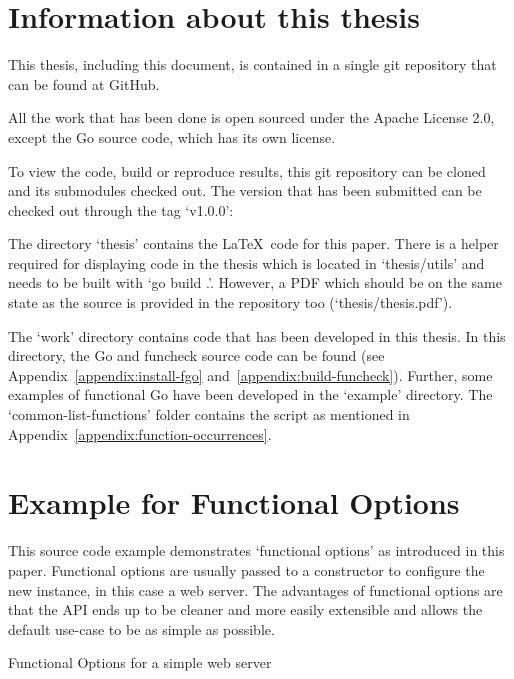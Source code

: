 \section{Information about this thesis}

This thesis, including this document, is contained in a single git repository
that can be found at GitHub\autocite{git-repo}.

All the work that has been done is open sourced under the Apache License 2.0,
except the Go source code, which has its own license.

To view the code, build or reproduce results, this git repository can be cloned
and its submodules checked out. The version that has been submitted can be checked
out through the tag `v1.0.0':

The directory `thesis' contains the \LaTeX\ code for this paper. There is a helper
required for displaying code in the thesis which is located in `thesis/utils' and
needs to be built with `go build .'. However, a PDF which should be on the same state
as the source is provided in the repository too (`thesis/thesis.pdf').

The `work' directory contains code that has been developed in this thesis. In this
directory, the Go and funcheck source code can be found (see Appendix~\ref{appendix:install-fgo}
and~\ref{appendix:build-funcheck}). Further, some examples
of functional Go have been developed in the `example' directory. The `common-list-functions'
folder contains the script as mentioned in Appendix~\ref{appendix:function-occurrences}.

\section{Example for Functional Options}\label{appendix:funcopts}

This source code example demonstrates `functional options' as introduced in this paper.
Functional options are usually passed to a constructor to configure the new instance, in
this case a web server. The advantages of functional options are that the API ends up to
be cleaner and more easily extensible and allows the default use-case to be as simple
as possible.

\begin{code}
    \caption{Functional Options for a simple web server}
\end{code}

